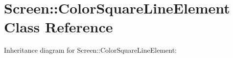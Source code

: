 \hypertarget{classScreen_1_1ColorSquareLineElement}{}\section{Screen\+:\+:Color\+Square\+Line\+Element Class Reference}
\label{classScreen_1_1ColorSquareLineElement}


Inheritance diagram for Screen\+:\+:Color\+Square\+Line\+Element\+:
